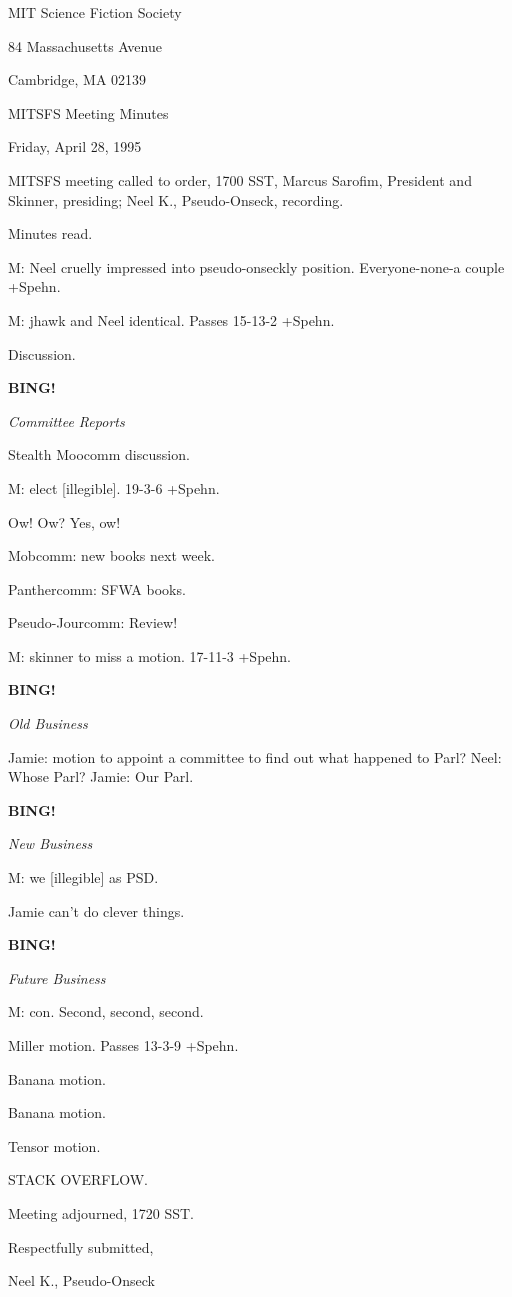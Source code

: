 \documentclass[12pt]{article}
\newcommand{\bing}{{\bf BING!} }
\newcommand{\goto}[1]{\bing \vskip 12pt \centerline{{\em{#1}}}}
\begin{document}
\begin{center}

MIT Science Fiction Society 

84 Massachusetts Avenue

Cambridge, MA 02139

\vspace{12pt}

MITSFS Meeting Minutes 

Friday, April 28, 1995

\end{center}
 
\vspace{18pt}

\setlength{\parskip}{6pt}

\noindent
MITSFS meeting called to order, 1700 SST,
Marcus Sarofim, President and Skinner, presiding; Neel K., Pseudo-Onseck, recording.

Minutes read.

M: Neel cruelly impressed into pseudo-onseckly position. Everyone-none-a couple +Spehn.

M: jhawk and Neel identical. Passes 15-13-2 +Spehn.

Discussion.

\goto{Committee Reports}

Stealth Moocomm discussion.

M: elect [illegible]. 19-3-6 +Spehn.

Ow! Ow? Yes, ow!

Mobcomm: new books next week.

Panthercomm: SFWA books.

Pseudo-Jourcomm: Review!

M: skinner to miss a motion. 17-11-3 +Spehn.

\goto{Old Business}

Jamie: motion to appoint a committee to find out what happened to Parl? Neel: Whose Parl? Jamie: Our Parl.


\goto{New Business}

M: we [illegible] as PSD.

Jamie can't do clever things.

\goto{Future Business}

M: con. Second, second, second.

Miller motion. Passes 13-3-9 +Spehn.

Banana motion.

Banana motion.

Tensor motion.

STACK OVERFLOW.

\vspace{12pt}

\noindent
Meeting adjourned, 1720 SST.

\vspace{18pt}

\centerline{Respectfully submitted,}
\centerline{Neel K., Pseudo-Onseck}
\end{document}
